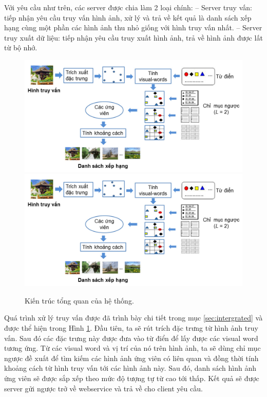 Với yêu cầu như trên, các server được chia làm 2 loại chính:
-- Server truy vấn: tiếp nhận yêu cầu truy vấn hình ảnh, xử lý và trả về kết quả là danh sách xếp hạng cùng một phần các hình ảnh thu nhỏ giống với hình truy vấn nhất.
-- Server truy xuất dữ liệu: tiếp nhận yêu cầu truy xuất hình ảnh, trả về hình ảnh được lất từ bộ nhớ.

\begin{figure}[!htbp]
  \begin{center}
    \leavevmode
    \ifpdf
      \includegraphics[scale=0.14]{query-process-server}
    \else
      \includegraphics[scale=0.14]{query-process-server}
    \fi
    \caption[Kiến trúc tổng quan của hệ thống]{Kiến trúc tổng quan của hệ thống.}
    \label{query-process-server}
  \end{center}
\end{figure}

Quá trình xử lý truy vấn được đã trình bày chi tiết trong mục \ref{sec:intergrated} và được thể hiện trong Hình \ref{query-process-server}. Đầu tiên, ta sẽ rút trích đặc trưng từ hình ảnh truy vấn. Sau đó các đặc trưng này được đưa vào từ điển để lấy được các visual word tương ứng. Từ các visual word và vị trí của nó trên hình ảnh, ta sẽ dùng chỉ mục ngược đề xuất để tìm kiếm các hình ảnh ứng viên có liên quan và đồng thời tính khoảng cách từ hình truy vấn tới các hình ảnh này. Sau đó, danh sách hình ảnh ứng viên sẽ được sắp xếp theo mức độ tượng tự từ cao tới thấp. Kết quả sẽ được server gửi ngược trở về webservice và trả về cho client yêu cầu.


